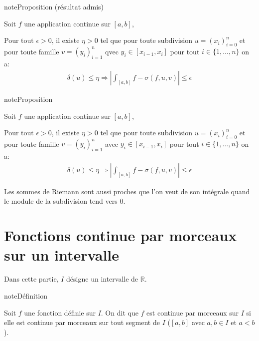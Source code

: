 \documentclass[letterpaper,10pt,french]{sphinxmanual}
\begin{document}
\begin{sphinxadmonition}{note}{Proposition (résultat admis)}

\sphinxAtStartPar
Soit \(f\) une application continue sur \([a, b]\),

\sphinxAtStartPar
Pour tout \(\epsilon > 0\), il existe \(\eta > 0\) tel que pour toute subdivision \(u=(x_i)_{i=0}^n\) et pour toute famille \(v=(y_i)_{i=1}^n\) qvec \(y_i \in [x_{i-1}, x_i]\) pour tout \(i \in \{1,\ldots,n\}\) on a:
\begin{equation*}
\begin{split}
\delta(u)\leq \eta \Rightarrow \left|\int_{[a, b]} f - \sigma(f, u, v)\right| \leq \epsilon
\end{split}
\end{equation*}\end{sphinxadmonition}

\begin{sphinxadmonition}{note}{Proposition}

\sphinxAtStartPar
Soit \(f\) une application continue sur \([a, b]\),

\sphinxAtStartPar
Pour tout \(\epsilon>0\), il existe \(\eta>0\) tel que pour toute subdivision \(u=(x_i)_{i=0}^n\) et pour toute famille \(v=(y_i)_{i=1}^n\) avec \(y_i \in [x_{i-1}, x_i]\) pour tout \(i \in \{1,\ldots,n\}\) on a:
\begin{equation*}
\begin{split}
\delta(u)\leq \eta \Rightarrow \left|\int_{[a, b]} f - \sigma(f, u, v)\right| \leq \epsilon
\end{split}
\end{equation*}\end{sphinxadmonition}

\sphinxAtStartPar
Les sommes de Riemann sont aussi proches que l’on veut de son intégrale quand le module de la subdivision tend vers 0.


\section{Fonctions continue par morceaux sur un intervalle}
\label{\detokenize{fcmint:fonctions-continue-par-morceaux-sur-un-intervalle}}\label{\detokenize{fcmint::doc}}
\sphinxAtStartPar
Dans cette partie, \(I\) désigne un intervalle de \(\mathbb R\).

\begin{sphinxadmonition}{note}{Définition}

\sphinxAtStartPar
Soit \(f\) une fonction définie sur \(I\). On dit que \(f\) est continue par morceaux sur \(I\) si elle est continue par morceaux sur tout segment de \(I\) (\([a, b]\) avec \(a, b \in I\) et \(a<b\)).
\end{sphinxadmonition}
\end{document}
